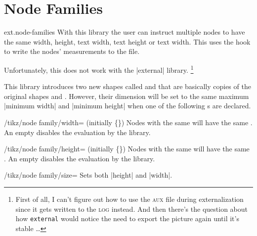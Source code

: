 %
%
%
\section{Node Families}
\begin{tikzlibrary}{ext.node-families}
  With this library the user can instruct multiple nodes to have the same
  width, height, text width, text height or text width.
  This uses the hook  to write the nodes'
  measurements to the  file.
  
  Unfortunately, this does not work with the |external| library.%
  \footnote{First of all, I can't figure out how to use the \textsc{aux} file during externalization since it gets written to the \textsc{log} instead.
            And then there's the question about how \texttt{external} would notice the need to export the picture again until it's stable \dots}


\end{tikzlibrary}

This library introduces two new shapes called  and 
that are basically copies of the original shapes  and .
However, their dimension will be set to the same maximum |minimum width| and |minimum height|
when one of the following s are declared.
\begin{key}{/tikz/node family/width= (initially \{\})}
Nodes with the same  will have the same .
An empty  disables the evaluation by the library.
\begin{codeexample}[preamble=\usetikzlibrary{positioning,ext.node-families},/tikz/node distance=.5cm]
\tikzexternaldisable %
\end{codeexample}
\end{key}
\begin{key}{/tikz/node family/height= (initially \{\})}
Nodes with the same  will have the same .
An empty  disables the evaluation by the library.
\end{key}
\begin{key}{/tikz/node family/size=}
Sets both |height| and |width|.
\end{key}

